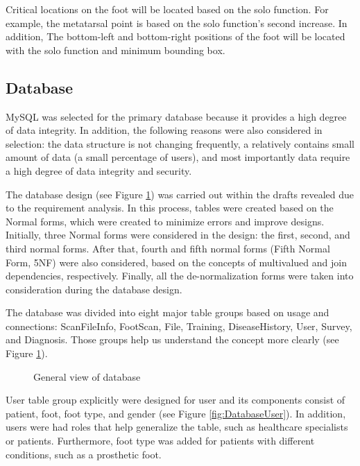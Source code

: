 Critical locations on the foot will be located based on the solo function. For example, the metatarsal point is based on the solo function's second increase. In addition, The bottom-left and bottom-right positions of the foot will be located with the solo function and minimum bounding box.

\subsection{Database} \label{sec:StudyIDatabase}

MySQL was selected for the primary database because it provides a high degree of data integrity. In addition, the following reasons were also considered in selection: the data structure is not changing frequently, a relatively contains small amount of data (a small percentage of users), and most importantly data require a high degree of data integrity and security.

The database design (see Figure \ref{fig:DatabaseGeneralView}) was carried out within the drafts revealed due to the requirement analysis. In this process, tables were created based on the Normal forms, which were created to minimize errors and improve designs. Initially, three Normal forms were considered in the design: the first, second, and third normal forms. After that, fourth and fifth normal forms (Fifth Normal Form, 5NF) were also considered, based on the concepts of multivalued and join dependencies, respectively. Finally, all the de-normalization forms were taken into consideration during the database design.

The database was divided into eight major table groups based on usage and connections: ScanFileInfo, FootScan, File, Training, DiseaseHistory, User, Survey, and Diagnosis. Those groups help us understand the concept more clearly (see Figure \ref{fig:DatabaseGeneralView}). 

\begin{figure}[htbp]
\centering
{}
\caption{General view of database}
\label{fig:DatabaseGeneralView}
\end{figure}

User table group explicitly were designed for user and its components consist of patient, foot, foot type, and gender (see Figure \ref{fig:DatabaseUser}). In addition, users were had roles that help generalize the table, such as healthcare specialists or patients. Furthermore, foot type was added for patients with different conditions, such as a prosthetic foot.


